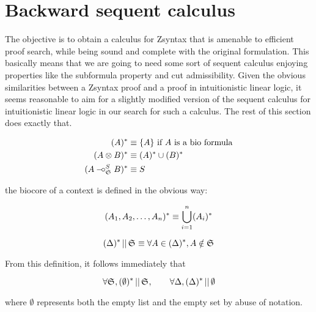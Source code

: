 \section{Backward sequent calculus}

The objective is to obtain a calculus for Zsyntax that is amenable to efficient proof
search, while being sound and complete with the original formulation. This
basically means that we are going to need some sort of sequent calculus enjoying
properties like the subformula property and cut admissibility.
Given the obvious similarities between a Zsyntax proof and a proof in
intuitionistic linear logic, it seems reasonable to aim for a slightly modified
version of the sequent calculus for intuitionistic linear logic in our search
for such a calculus. The rest of this section does exactly that.

\begin{align*}
  (A)^{*} & \equiv \{A\} \ \text{if } A\ \text{is a bio formula} \\
  (A \otimes B)^{*} & \equiv (A)^{*} \cup (B)^{*} \\
  (A \mathbin{{-}\mkern-3.5mu{\circ}}^{S}_{\mathfrak{S}_{}} B)^{*} & \equiv S
\end{align*}

the biocore of a context is defined in the obvious way:

\[
  (A_1, A_2, \dots, A_n)^{*} \equiv \bigcup_{i = 1}^{n}(A_i)^{*}
\]

\[
  (\Delta)^{*} \, || \, \mathfrak{S}_{} \equiv \forall A \in (\Delta)^{*}, A \notin \mathfrak{S}_{}
\]

From this definition, it follows immediately that

\[
  \forall \mathfrak{S}_{}, (\emptyset)^{*} \, || \, \mathfrak{S}_{}, \qquad
  \forall \Delta, (\Delta)^{*} \, || \, \emptyset
\]

where $\emptyset$ represents both the empty list and the empty set by abuse of
notation.

